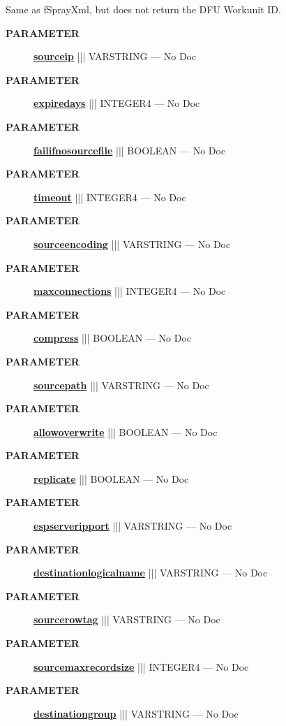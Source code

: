 \par





Same as fSprayXml, but does not return the DFU Workunit ID.






\par
\begin{description}
\item [\colorbox{tagtype}{\color{white} \textbf{\textsf{PARAMETER}}}] \textbf{\underline{sourceip}} ||| VARSTRING --- No Doc
\item [\colorbox{tagtype}{\color{white} \textbf{\textsf{PARAMETER}}}] \textbf{\underline{expiredays}} ||| INTEGER4 --- No Doc
\item [\colorbox{tagtype}{\color{white} \textbf{\textsf{PARAMETER}}}] \textbf{\underline{failifnosourcefile}} ||| BOOLEAN --- No Doc
\item [\colorbox{tagtype}{\color{white} \textbf{\textsf{PARAMETER}}}] \textbf{\underline{timeout}} ||| INTEGER4 --- No Doc
\item [\colorbox{tagtype}{\color{white} \textbf{\textsf{PARAMETER}}}] \textbf{\underline{sourceencoding}} ||| VARSTRING --- No Doc
\item [\colorbox{tagtype}{\color{white} \textbf{\textsf{PARAMETER}}}] \textbf{\underline{maxconnections}} ||| INTEGER4 --- No Doc
\item [\colorbox{tagtype}{\color{white} \textbf{\textsf{PARAMETER}}}] \textbf{\underline{compress}} ||| BOOLEAN --- No Doc
\item [\colorbox{tagtype}{\color{white} \textbf{\textsf{PARAMETER}}}] \textbf{\underline{sourcepath}} ||| VARSTRING --- No Doc
\item [\colorbox{tagtype}{\color{white} \textbf{\textsf{PARAMETER}}}] \textbf{\underline{allowoverwrite}} ||| BOOLEAN --- No Doc
\item [\colorbox{tagtype}{\color{white} \textbf{\textsf{PARAMETER}}}] \textbf{\underline{replicate}} ||| BOOLEAN --- No Doc
\item [\colorbox{tagtype}{\color{white} \textbf{\textsf{PARAMETER}}}] \textbf{\underline{espserveripport}} ||| VARSTRING --- No Doc
\item [\colorbox{tagtype}{\color{white} \textbf{\textsf{PARAMETER}}}] \textbf{\underline{destinationlogicalname}} ||| VARSTRING --- No Doc
\item [\colorbox{tagtype}{\color{white} \textbf{\textsf{PARAMETER}}}] \textbf{\underline{sourcerowtag}} ||| VARSTRING --- No Doc
\item [\colorbox{tagtype}{\color{white} \textbf{\textsf{PARAMETER}}}] \textbf{\underline{sourcemaxrecordsize}} ||| INTEGER4 --- No Doc
\item [\colorbox{tagtype}{\color{white} \textbf{\textsf{PARAMETER}}}] \textbf{\underline{destinationgroup}} ||| VARSTRING --- No Doc
\end{description}







